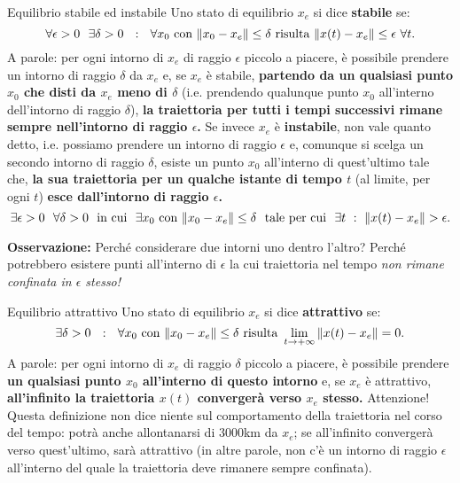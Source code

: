 \documentclass[a4paper]{report}
\begin{document}
\begin{defin}{Equilibrio stabile ed instabile}{}
Uno stato di equilibrio $x_e$ si dice \textbf{stabile} se:
\begin{equation}
	\forall \epsilon > 0 \ \ \exists \delta > 0 \ \ : \ \ \forall x_0 \ \textrm{con} \ \norm{x_0 - x_e} \leq \delta \ \textrm{risulta} \ \norm{x(t) - x_e} \leq \epsilon \ \forall t.
\end{equation} 	
A parole: per ogni intorno di $x_e$ di raggio $\epsilon$ piccolo a piacere, è possibile prendere un intorno di raggio $\delta$ da $x_e$ e, se $x_e$ è stabile, \textbf{partendo da un qualsiasi punto $x_0$ che disti da $x_e$ meno di $\delta$} (i.e. prendendo qualunque punto $x_0$ all'interno dell'intorno di raggio $\delta$), \textbf{la traiettoria per tutti i tempi successivi rimane sempre nell'intorno di raggio $\epsilon$.}
\bb
Se invece $x_e$ è \textbf{instabile}, non vale quanto detto, i.e. possiamo prendere un intorno di raggio $\epsilon$ e, comunque si scelga un secondo intorno di raggio $\delta$, esiste un punto $x_0$ all'interno di quest'ultimo tale che, \textbf{la sua traiettoria per un qualche istante di tempo $t$} (al limite, per ogni $t$) \textbf{esce dall'intorno di raggio $\epsilon$.}
\begin{equation*}
	\exists \epsilon > 0 \ \ \forall \delta > 0 \ \ \textrm{in cui} \ \ \exists x_0 \ \textrm{con} \ \norm{x_0 - x_e} \leq \delta \ \ \textrm{tale per cui} \ \ \exists t \ : \ \norm{x(t) - x_e} > \epsilon.
\end{equation*} 
\end{defin}
\textbf{Osservazione:} Perché considerare due intorni uno dentro l'altro? Perché potrebbero esistere punti all'interno di $\epsilon$ la cui traiettoria nel tempo \textit{non rimane confinata in $\epsilon$ stesso!}
\begin{defin}{Equilibrio attrattivo}{}
Uno stato di equilibrio $x_e$ si dice \textbf{attrattivo} se:
\begin{equation}
	\exists \delta > 0 \ \ : \ \ \forall x_0 \ \textrm{con} \ \norm{x_0 - x_e} \leq \delta \ \textrm{risulta} \ \llimit{t}{\pinf}{\norm{x(t)-x_e}} = 0.
\end{equation}	
A parole: per ogni intorno di $x_e$ di raggio $\delta$ piccolo a piacere, è possibile prendere \textbf{un qualsiasi punto $x_0$ all'interno di questo intorno} e, se $x_e$ è attrattivo, \textbf{all'infinito la traiettoria $x(t)$ convergerà verso $x_e$ stesso.} 
\bb
Attenzione! Questa definizione non dice niente sul comportamento della traiettoria nel corso del tempo: potrà anche allontanarsi di 3000km da $x_e$; se all'infinito convergerà verso quest'ultimo, sarà attrattivo (in altre parole, non c'è un intorno di raggio $\epsilon$ all'interno del quale la traiettoria deve rimanere sempre confinata).
\end{defin}
\end{document}
